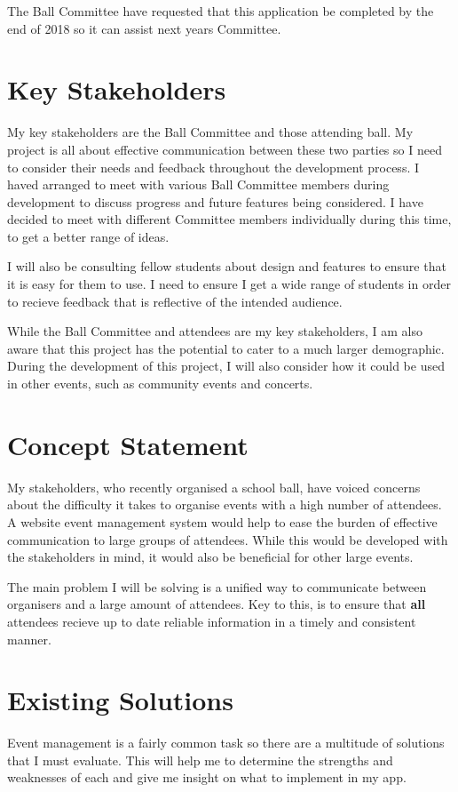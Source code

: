 \documentclass[a4paper,oneside,12pt]{report}
\begin{document}
	The Ball Committee have requested that this application be completed by the end of 2018 so it can assist next years Committee.

	\section{Key Stakeholders}
	My key stakeholders are the Ball Committee and those attending ball. My project is all about effective communication between these two parties so I need to consider their needs and feedback throughout the development process. I haved arranged to meet with various Ball Committee members during development to discuss progress and future features being considered. I have decided to meet with different Committee members individually during this time, to get a better range of ideas.

	I will also be consulting fellow students about design and features to ensure that it is easy for them to use. I need to ensure I get a wide range of students in order to recieve feedback that is reflective of the intended audience.

	While the Ball Committee and attendees are my key stakeholders, I am also aware that this project has the potential to cater to a much larger demographic. During the development of this project, I will also consider how it could be used in other events, such as community events and concerts.

	\section{Concept Statement}
	My stakeholders, who recently organised a school ball, have voiced concerns about the difficulty it takes to organise events with a high number of attendees. A website event management system would help to ease the burden of effective communication to large groups of attendees. While this would be developed with the stakeholders in mind, it would also be beneficial for other large events.

	The main problem I will be solving is a unified way to communicate between organisers and a large amount of attendees. Key to this, is to ensure that \textbf{all} attendees recieve up to date reliable information in a timely and consistent manner.

	\section{Existing Solutions}
	Event management is a fairly common task so there are a multitude of solutions that I must evaluate. This will help me to determine the strengths and weaknesses of each and give me insight on what to implement in my app.
\end{document}
